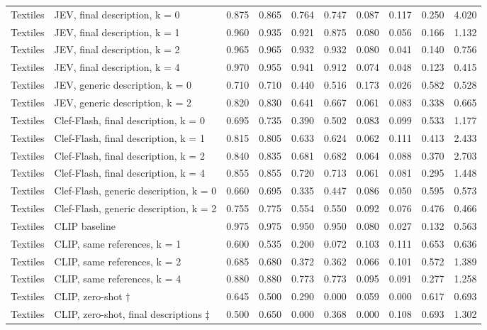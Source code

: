 \begin{table}
\begin{tabular}[t]{llrrrrrrrr}
Textiles & JEV, final description, k = 0 & 0.875 & 0.865 & 0.764 & 0.747 & 0.087 & 0.117 & 0.250 & 4.020\\
Textiles & JEV, final description, k = 1 & 0.960 & 0.935 & 0.921 & 0.875 & 0.080 & 0.056 & 0.166 & 1.132\\
Textiles & JEV, final description, k = 2 & 0.965 & 0.965 & 0.932 & 0.932 & 0.080 & 0.041 & 0.140 & 0.756\\
Textiles & JEV, final description, k = 4 & 0.970 & 0.955 & 0.941 & 0.912 & 0.074 & 0.048 & 0.123 & 0.415\\
\addlinespace
Textiles & JEV, generic description, k = 0 & 0.710 & 0.710 & 0.440 & 0.516 & 0.173 & 0.026 & 0.582 & 0.528\\
Textiles & JEV, generic description, k = 2 & 0.820 & 0.830 & 0.641 & 0.667 & 0.061 & 0.083 & 0.338 & 0.665\\
Textiles & Clef-Flash, final description, k = 0 & 0.695 & 0.735 & 0.390 & 0.502 & 0.083 & 0.099 & 0.533 & 1.177\\
Textiles & Clef-Flash, final description, k = 1 & 0.815 & 0.805 & 0.633 & 0.624 & 0.062 & 0.111 & 0.413 & 2.433\\
Textiles & Clef-Flash, final description, k = 2 & 0.840 & 0.835 & 0.681 & 0.682 & 0.064 & 0.088 & 0.370 & 2.703\\
\addlinespace
Textiles & Clef-Flash, final description, k = 4 & 0.855 & 0.855 & 0.720 & 0.713 & 0.061 & 0.081 & 0.295 & 1.448\\
Textiles & Clef-Flash, generic description, k = 0 & 0.660 & 0.695 & 0.335 & 0.447 & 0.086 & 0.050 & 0.595 & 0.573\\
Textiles & Clef-Flash, generic description, k = 2 & 0.755 & 0.775 & 0.554 & 0.550 & 0.092 & 0.076 & 0.476 & 0.466\\
Textiles & CLIP baseline & 0.975 & 0.975 & 0.950 & 0.950 & 0.080 & 0.027 & 0.132 & 0.563\\
Textiles & CLIP, same references, k = 1 & 0.600 & 0.535 & 0.200 & 0.072 & 0.103 & 0.111 & 0.653 & 0.636\\
\addlinespace
Textiles & CLIP, same references, k = 2 & 0.685 & 0.680 & 0.372 & 0.362 & 0.066 & 0.101 & 0.572 & 1.389\\
Textiles & CLIP, same references, k = 4 & 0.880 & 0.880 & 0.773 & 0.773 & 0.095 & 0.091 & 0.277 & 1.258\\
Textiles & CLIP, zero-shot † & 0.645 & 0.500 & 0.290 & 0.000 & 0.059 & 0.000 & 0.617 & 0.693\\
Textiles & CLIP, zero-shot, final descriptions ‡ & 0.500 & 0.650 & 0.000 & 0.368 & 0.000 & 0.108 & 0.693 & 1.302\\

\end{tabular}
\end{table}
